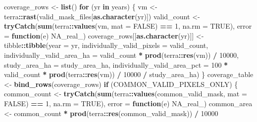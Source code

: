 \documentclass[
]{article}
\newenvironment{Shaded}{\begin{snugshade}}{\end{snugshade}}
\newcommand{\AttributeTok}[1]{\textcolor[rgb]{0.13,0.29,0.53}{#1}}
\newcommand{\ConstantTok}[1]{\textcolor[rgb]{0.56,0.35,0.01}{#1}}
\newcommand{\ControlFlowTok}[1]{\textcolor[rgb]{0.13,0.29,0.53}{\textbf{#1}}}
\newcommand{\DecValTok}[1]{\textcolor[rgb]{0.00,0.00,0.81}{#1}}
\newcommand{\FunctionTok}[1]{\textcolor[rgb]{0.13,0.29,0.53}{\textbf{#1}}}
\newcommand{\NormalTok}[1]{#1}
\newcommand{\OtherTok}[1]{\textcolor[rgb]{0.56,0.35,0.01}{#1}}
\newcommand{\SpecialCharTok}[1]{\textcolor[rgb]{0.81,0.36,0.00}{\textbf{#1}}}
\begin{document}
\begin{Shaded}
\begin{Highlighting}[]
\NormalTok{coverage\_rows }\OtherTok{\textless{}{-}} \FunctionTok{list}\NormalTok{()}
\ControlFlowTok{for}\NormalTok{ (yr }\ControlFlowTok{in}\NormalTok{ years) \{}
\NormalTok{  vm }\OtherTok{\textless{}{-}}\NormalTok{ terra}\SpecialCharTok{::}\FunctionTok{rast}\NormalTok{(valid\_mask\_files[}\FunctionTok{as.character}\NormalTok{(yr)])}
\NormalTok{  valid\_count }\OtherTok{\textless{}{-}} \FunctionTok{tryCatch}\NormalTok{(}\FunctionTok{sum}\NormalTok{(terra}\SpecialCharTok{::}\FunctionTok{values}\NormalTok{(vm, }\AttributeTok{mat =} \ConstantTok{FALSE}\NormalTok{) }\SpecialCharTok{==} \DecValTok{1}\NormalTok{, }\AttributeTok{na.rm =} \ConstantTok{TRUE}\NormalTok{), }\AttributeTok{error =} \ControlFlowTok{function}\NormalTok{(e) }\ConstantTok{NA\_real\_}\NormalTok{)}
\NormalTok{  coverage\_rows[[}\FunctionTok{as.character}\NormalTok{(yr)]] }\OtherTok{\textless{}{-}}\NormalTok{ tibble}\SpecialCharTok{::}\FunctionTok{tibble}\NormalTok{(}\AttributeTok{year =}\NormalTok{ yr,}
    \AttributeTok{individually\_valid\_pixels =}\NormalTok{ valid\_count,}
    \AttributeTok{individually\_valid\_area\_ha =}\NormalTok{ valid\_count }\SpecialCharTok{*} \FunctionTok{prod}\NormalTok{(terra}\SpecialCharTok{::}\FunctionTok{res}\NormalTok{(vm)) }\SpecialCharTok{/} \DecValTok{10000}\NormalTok{,}
    \AttributeTok{study\_area\_ha =}\NormalTok{ study\_area\_ha,}
    \AttributeTok{individually\_valid\_area\_pct =} \DecValTok{100} \SpecialCharTok{*}\NormalTok{ valid\_count }\SpecialCharTok{*} \FunctionTok{prod}\NormalTok{(terra}\SpecialCharTok{::}\FunctionTok{res}\NormalTok{(vm)) }\SpecialCharTok{/} \DecValTok{10000} \SpecialCharTok{/}\NormalTok{ study\_area\_ha)}
\NormalTok{\}}
\NormalTok{coverage\_table }\OtherTok{\textless{}{-}} \FunctionTok{bind\_rows}\NormalTok{(coverage\_rows)}
\ControlFlowTok{if}\NormalTok{ (COMMON\_VALID\_PIXELS\_ONLY) \{}
\NormalTok{  common\_count }\OtherTok{\textless{}{-}} \FunctionTok{tryCatch}\NormalTok{(}\FunctionTok{sum}\NormalTok{(terra}\SpecialCharTok{::}\FunctionTok{values}\NormalTok{(common\_valid\_mask, }\AttributeTok{mat =} \ConstantTok{FALSE}\NormalTok{) }\SpecialCharTok{==} \DecValTok{1}\NormalTok{, }\AttributeTok{na.rm =} \ConstantTok{TRUE}\NormalTok{), }\AttributeTok{error =} \ControlFlowTok{function}\NormalTok{(e) }\ConstantTok{NA\_real\_}\NormalTok{)}
\NormalTok{  common\_area }\OtherTok{\textless{}{-}}\NormalTok{ common\_count }\SpecialCharTok{*} \FunctionTok{prod}\NormalTok{(terra}\SpecialCharTok{::}\FunctionTok{res}\NormalTok{(common\_valid\_mask)) }\SpecialCharTok{/} \DecValTok{10000}

\end{Highlighting}
\end{Shaded}
\end{document}
